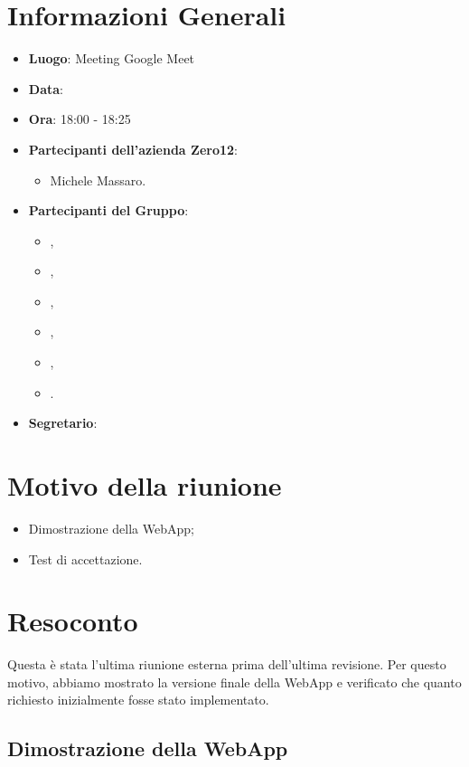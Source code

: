 \section{Informazioni Generali}

\begin{itemize}
\item{\textbf{Luogo}}: Meeting Google Meet
\item{\textbf{Data}}: \D
\item{\textbf{Ora}}: 18:00 - 18:25
\item{\textbf{Partecipanti dell'azienda Zero12}}: 
	\begin{itemize}
	\item{Michele Massaro.} 
	\end{itemize} 
\item{\textbf{Partecipanti del Gruppo}}: 
	\begin{itemize}
	\item{\EP{},} 
	\item{\FP{},}
	\item{\GC{},}
	\item{\LW{},}	
	\item{\MB{},}
	\item{\MG{}.}
	\end{itemize} 
\item{\textbf{Segretario}}: \GC
\end{itemize}

\section{Motivo della riunione}
\begin{itemize}
	\item {Dimostrazione della WebApp;}
	\item {Test di accettazione.}
\end{itemize}

\section{Resoconto}

Questa è stata l'ultima riunione esterna prima dell'ultima revisione. Per questo motivo, abbiamo mostrato la versione finale della WebApp e verificato che quanto richiesto inizialmente fosse stato implementato. 

\subsection{Dimostrazione della WebApp}


